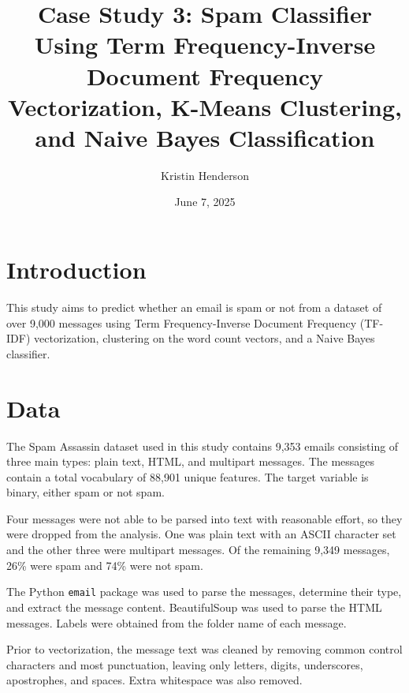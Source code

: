 \documentclass{article}      %
\title{Case Study 3: Spam Classifier\\[0.5em]
\large Using Term Frequency-Inverse Document Frequency Vectorization, K-Means Clustering, and Naive Bayes Classification}
\author{Kristin Henderson}   %
\date{June 7, 2025}          %
\begin{document}

\maketitle                   %

\section{Introduction}       %

This study aims to predict whether an email is spam or not from a dataset of over 9,000 messages using Term Frequency-Inverse Document Frequency (TF-IDF) vectorization, clustering on the word count vectors, and a Naive Bayes classifier. 

\section{Data}
The Spam Assassin dataset used in this study contains 9,353 emails consisting of three main types: plain text, HTML, and multipart messages. The messages contain a total vocabulary of 88,901 unique features. The target variable is binary, either spam or not spam.

Four messages were not able to be parsed into text with reasonable effort, so they were dropped from the analysis. One was plain text with an ASCII character set and the other three were multipart messages. Of the remaining 9,349 messages, 26\% were spam and 74\% were not spam.

The Python \texttt{email} package was used to parse the messages, determine their type, and extract the message content. BeautifulSoup was used to parse the HTML messages. Labels were obtained from the folder name of each message.

Prior to vectorization, the message text was cleaned by removing common control characters and most punctuation, leaving only letters, digits, underscores, apostrophes, and spaces. Extra whitespace was also removed.
\end{document}
